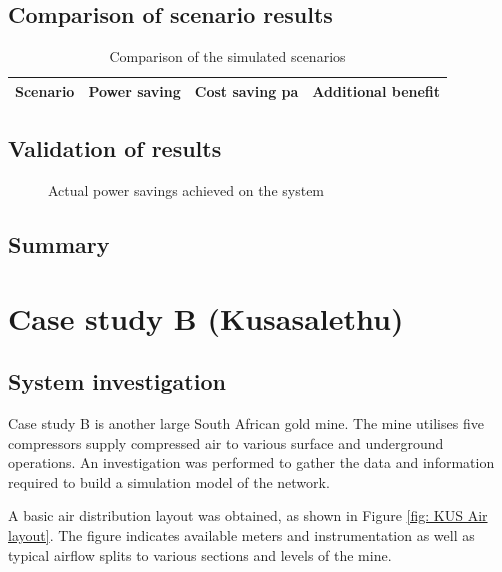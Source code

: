\subsection{Comparison of scenario results}
\begin{table}[h]
	\centering
	\begin{tabular}{lccr}
		\hline 
		Scenario \hspace{2cm} & Power saving & Cost saving \gls{pa} & Additional benefit  \\

		\hline 
	\end{tabular}
	\caption{Comparison of the simulated scenarios}
	\label{Table: A Comparison}
\end{table}
\subsection{Validation of results}
\begin{figure}[h!]
	\centering
	
	\caption{Actual power savings achieved on the system}
	\label{fig: Actual permormance beet}
\end{figure}
\subsection{Summary}
\newpage
\section{Case study B \tiny{\color{blue}(Kusasalethu)}}

	\subsection{System investigation}
	Case study B is another large South African gold mine. The mine utilises five compressors supply compressed air to various surface and underground operations. An investigation was performed to gather the data and information required to build a simulation model of the network.
	\par 
	A basic air distribution layout was obtained, as shown in Figure \ref{fig: KUS Air layout}.  The figure indicates available meters and instrumentation as well as typical airflow splits to various sections and levels of the mine.
	\par 

